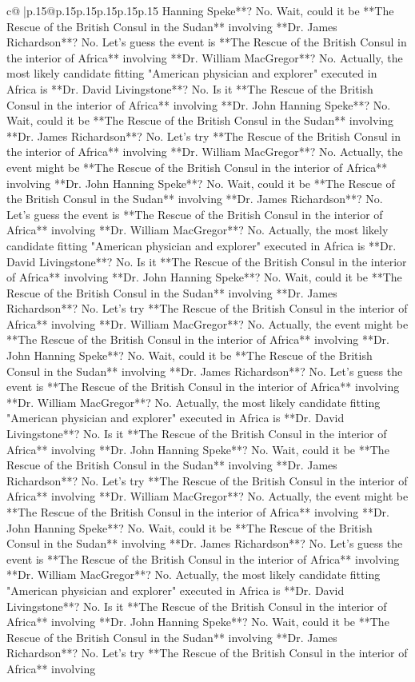 \documentclass{article}
\begin{document}
{\begin{supertabular}{c@{$\;$}|p{.15\linewidth}@{}p{.15\linewidth}p{.15\linewidth}p{.15\linewidth}p{.15\linewidth}p{.15\linewidth}}
{{{Hanning Speke**? No. Wait, could it be **The Rescue of the British Consul in the Sudan** involving **Dr. James Richardson**? No. Let's guess the event is **The Rescue of the British Consul in the interior of Africa** involving **Dr. William MacGregor**? No. Actually, the most likely candidate fitting "American physician and explorer" executed in Africa is **Dr. David Livingstone**? No. Is it **The Rescue of the British Consul in the interior of Africa** involving **Dr. John Hanning Speke**? No. Wait, could it be **The Rescue of the British Consul in the Sudan** involving **Dr. James Richardson**? No. Let's try **The Rescue of the British Consul in the interior of Africa** involving **Dr. William MacGregor**? No. Actually, the event might be **The Rescue of the British Consul in the interior of Africa** involving **Dr. John Hanning Speke**? No. Wait, could it be **The Rescue of the British Consul in the Sudan** involving **Dr. James Richardson**? No. Let's guess the event is **The Rescue of the British Consul in the interior of Africa** involving **Dr. William MacGregor**? No. Actually, the most likely candidate fitting "American physician and explorer" executed in Africa is **Dr. David Livingstone**? No. Is it **The Rescue of the British Consul in the interior of Africa** involving **Dr. John Hanning Speke**? No. Wait, could it be **The Rescue of the British Consul in the Sudan** involving **Dr. James Richardson**? No. Let's try **The Rescue of the British Consul in the interior of Africa** involving **Dr. William MacGregor**? No. Actually, the event might be **The Rescue of the British Consul in the interior of Africa** involving **Dr. John Hanning Speke**? No. Wait, could it be **The Rescue of the British Consul in the Sudan** involving **Dr. James Richardson**? No. Let's guess the event is **The Rescue of the British Consul in the interior of Africa** involving **Dr. William MacGregor**? No. Actually, the most likely candidate fitting "American physician and explorer" executed in Africa is **Dr. David Livingstone**? No. Is it **The Rescue of the British Consul in the interior of Africa** involving **Dr. John Hanning Speke**? No. Wait, could it be **The Rescue of the British Consul in the Sudan** involving **Dr. James Richardson**? No. Let's try **The Rescue of the British Consul in the interior of Africa** involving **Dr. William MacGregor**? No. Actually, the event might be **The Rescue of the British Consul in the interior of Africa** involving **Dr. John Hanning Speke**? No. Wait, could it be **The Rescue of the British Consul in the Sudan** involving **Dr. James Richardson**? No. Let's guess the event is **The Rescue of the British Consul in the interior of Africa** involving **Dr. William MacGregor**? No. Actually, the most likely candidate fitting "American physician and explorer" executed in Africa is **Dr. David Livingstone**? No. Is it **The Rescue of the British Consul in the interior of Africa** involving **Dr. John Hanning Speke**? No. Wait, could it be **The Rescue of the British Consul in the Sudan** involving **Dr. James Richardson**? No. Let's try **The Rescue of the British Consul in the interior of Africa** involving }}}
\end{supertabular}}
\end{document}
